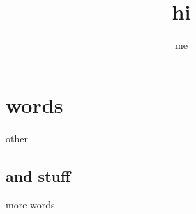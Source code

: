\documentclass[12pt]{article}
\title{hi}
\author{me}
\begin{document}
	
	\maketitle
	
	\section{words}
	other
	\subsection{and stuff}
	more words
\end{document}
